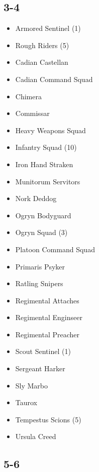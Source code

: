 \documentclass{HordeModeTarot}
\begin{document}
\begin{multicols}{2}

\subsection*{3-4}

\begin{itemize}[leftmargin=*]
\item[] Armored Sentinel (1)
\item[] Rough Riders (5)
\item[] Cadian Castellan
\item[] Cadian Command Squad
\item[] Chimera
\item[] Commissar
\item[] Heavy Weapons Squad
\item[] Infantry Squad (10)
\item[] Iron Hand Straken
\item[] Munitorum Servitors
\item[] Nork Deddog
\item[] Ogryn Bodyguard
\item[] Ogryn Squad (3)
\item[] Platoon Command Squad
\item[] Primaris Psyker
\item[] Ratling Snipers
\item[] Regimental Attaches
\item[] Regimental Enginseer
\item[] Regimental Preacher
\item[] Scout Sentinel (1)
\item[] Sergeant Harker
\item[] Sly Marbo
\item[] Taurox
\item[] Tempestus Scions (5)
\item[] Ursula Creed
\end{itemize}

\subsection*{5-6}


\end{multicols}
\end{document}
